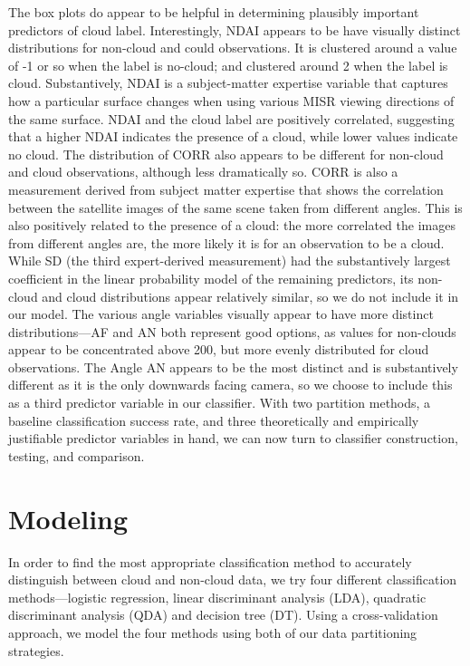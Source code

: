 \documentclass[12pt]{article}
\begin{document}
The box plots do appear to be helpful in determining plausibly important predictors of cloud label. Interestingly, NDAI appears to be have visually distinct distributions for non-cloud and could observations. It is clustered around a value of -1 or so when the label is no-cloud; and clustered around 2 when the label is cloud. Substantively, NDAI is a subject-matter expertise variable that captures how a particular surface changes when using various MISR viewing directions of the same surface. NDAI and the cloud label are positively correlated, suggesting that a higher NDAI indicates the presence of a cloud, while lower values indicate no cloud. The distribution of CORR also appears to be different for non-cloud and cloud observations, although less dramatically so. CORR is also a measurement derived from subject matter expertise that shows the correlation between the satellite images of the same scene taken from different angles. This is also positively related to the presence of a cloud: the more correlated the images from different angles are, the more likely it is for an observation to be a cloud. While SD (the third expert-derived measurement) had the substantively largest coefficient in the linear probability model of the remaining predictors, its non-cloud and cloud distributions appear relatively similar, so we do not include it in our model. The various angle variables visually appear to have more distinct distributions---AF and AN both represent good options, as values for non-clouds appear to be concentrated above 200, but more evenly distributed for cloud observations. The Angle AN appears to be the most distinct and is substantively different as it is the only downwards facing camera, so we choose to include this as a third predictor variable in our classifier. With two partition methods, a baseline classification success rate, and three theoretically and empirically justifiable predictor variables in hand, we can now turn to classifier construction, testing, and comparison. 

\section{Modeling}
In order to find the most appropriate classification method to accurately distinguish between cloud and non-cloud data, we try four different classification methods---logistic regression, linear discriminant analysis (LDA), quadratic discriminant analysis (QDA) and decision tree (DT). Using a cross-validation approach, we model the four methods using both of our data partitioning strategies. 
\end{document}
